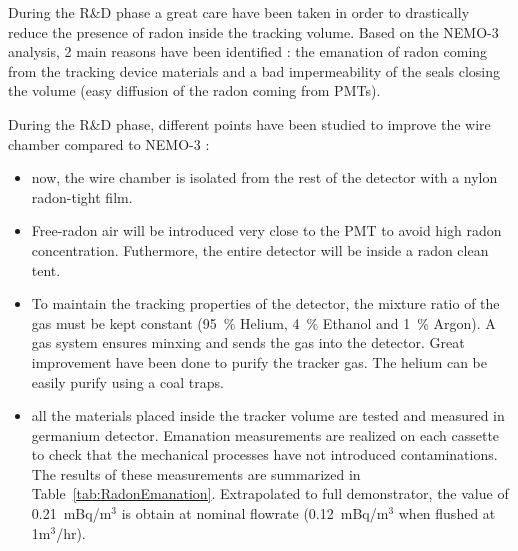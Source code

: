 \documentclass[main.tex]{subfiles}
\begin{document}
\bigskip


\NI During the R\&D phase a great care have been taken in order to drastically reduce the presence of radon inside the tracking volume. Based on the NEMO-3 analysis, 2 main reasons have been identified : the emanation of radon coming from the tracking device materials and a bad impermeability of the seals closing the volume (easy diffusion of the radon coming from PMTs).


\bigskip

\NI During the R\&D phase, different points have been studied to improve the wire chamber compared to NEMO-3 : 


\begin{itemize}
\item now, the wire chamber is isolated from the rest of the detector with a nylon radon-tight film.


\item Free-radon air will be introduced very close to the PMT to avoid high radon concentration. Futhermore, the entire detector will be inside a radon clean tent.


\item To maintain the tracking properties of the detector, the mixture ratio of the gas must be kept constant 
(95~\% Helium, 4~\% Ethanol and 1~\% Argon). A gas system ensures minxing and sends the gas into the detector. Great improvement have been done to purify the tracker gas. The helium can be easily purify using a coal traps.


\item all the materials placed inside the tracker volume are tested and measured in germanium detector. Emanation measurements are realized on each cassette to check that the mechanical processes have not introduced contaminations. The results of these measurements are summarized in Table~\ref{tab:RadonEmanation}. Extrapolated to full demonstrator, the value of 0.21~mBq/m$^{\text{3}}$ is obtain at nominal flowrate (0.12~mBq/m$^{\text{3}}$ when flushed at 1m$^{\text{3}}$/hr). 
\end{itemize}
\end{document}
